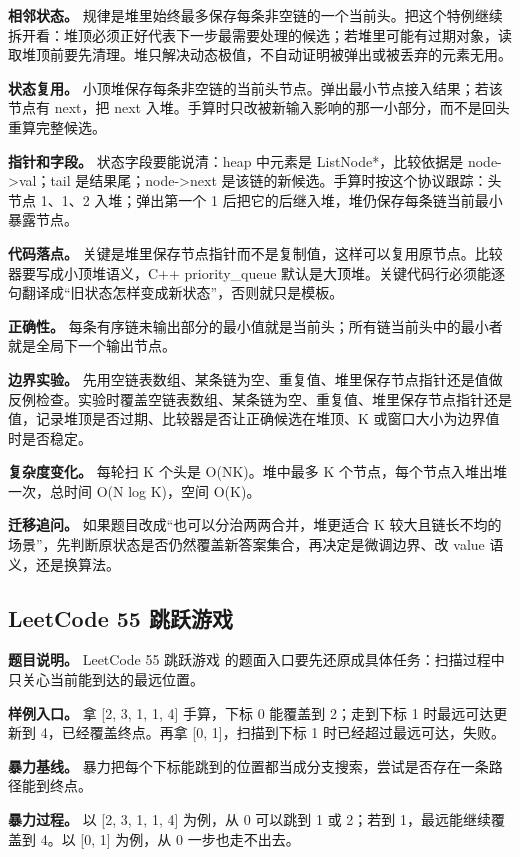 \textbf{相邻状态。} 规律是堆里始终最多保存每条非空链的一个当前头。把这个特例继续拆开看：堆顶必须正好代表下一步最需要处理的候选；若堆里可能有过期对象，读取堆顶前要先清理。堆只解决动态极值，不自动证明被弹出或被丢弃的元素无用。

\textbf{状态复用。} 小顶堆保存每条非空链的当前头节点。弹出最小节点接入结果；若该节点有 next，把 next 入堆。手算时只改被新输入影响的那一小部分，而不是回头重算完整候选。

\textbf{指针和字段。} 状态字段要能说清：heap 中元素是 ListNode*，比较依据是 node->val；tail 是结果尾；node->next 是该链的新候选。手算时按这个协议跟踪：头节点 1、1、2 入堆；弹出第一个 1 后把它的后继入堆，堆仍保存每条链当前最小暴露节点。

\textbf{代码落点。} 关键是堆里保存节点指针而不是复制值，这样可以复用原节点。比较器要写成小顶堆语义，C++ priority\_queue 默认是大顶堆。关键代码行必须能逐句翻译成“旧状态怎样变成新状态”，否则就只是模板。

\textbf{正确性。} 每条有序链未输出部分的最小值就是当前头；所有链当前头中的最小者就是全局下一个输出节点。

\textbf{边界实验。} 先用空链表数组、某条链为空、重复值、堆里保存节点指针还是值做反例检查。实验时覆盖空链表数组、某条链为空、重复值、堆里保存节点指针还是值，记录堆顶是否过期、比较器是否让正确候选在堆顶、K 或窗口大小为边界值时是否稳定。

\textbf{复杂度变化。} 每轮扫 K 个头是 O(NK)。堆中最多 K 个节点，每个节点入堆出堆一次，总时间 O(N log K)，空间 O(K)。

\textbf{迁移追问。} 如果题目改成“也可以分治两两合并，堆更适合 K 较大且链长不均的场景”，先判断原状态是否仍然覆盖新答案集合，再决定是微调边界、改 value 语义，还是换算法。

\subsection{LeetCode 55 跳跃游戏}

\textbf{题目说明。} LeetCode 55 跳跃游戏 的题面入口要先还原成具体任务：扫描过程中只关心当前能到达的最远位置。

\textbf{样例入口。} 拿 [2, 3, 1, 1, 4] 手算，下标 0 能覆盖到 2；走到下标 1 时最远可达更新到 4，已经覆盖终点。再拿 [0, 1]，扫描到下标 1 时已经超过最远可达，失败。

\textbf{暴力基线。} 暴力把每个下标能跳到的位置都当成分支搜索，尝试是否存在一条路径能到终点。

\textbf{暴力过程。} 以 [2, 3, 1, 1, 4] 为例，从 0 可以跳到 1 或 2；若到 1，最远能继续覆盖到 4。以 [0, 1] 为例，从 0 一步也走不出去。

